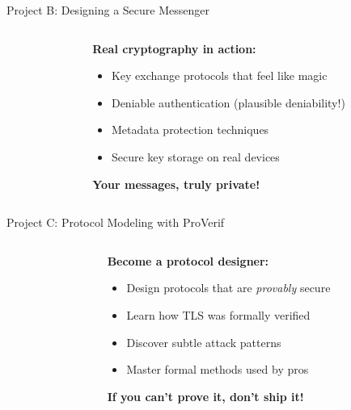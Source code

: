 \documentclass[aspectratio=169, lualatex, handout]{beamer}
\begin{document}
\begin{frame}{Project B: Designing a Secure Messenger}
	\begin{columns}[c]
		\begin{column}{0.5\textwidth}
		\end{column}
		\begin{column}{0.5\textwidth}
			\textbf{Real cryptography in action:}
			\begin{itemize}[<+->]
				\item Key exchange protocols that feel like magic
				\item Deniable authentication (plausible deniability!)
				\item Metadata protection techniques
				\item Secure key storage on real devices
			\end{itemize}
			\vspace{0.5cm}
			\textcolor{cipherprimary}{\textbf{Your messages, truly private!}}
		\end{column}
	\end{columns}
\end{frame}

\begin{frame}{Project C: Protocol Modeling with ProVerif}
	\begin{columns}[c]
		\begin{column}{0.5\textwidth}
		\end{column}
		\begin{column}{0.5\textwidth}
			\textbf{Become a protocol designer:}
			\begin{itemize}[<+->]
				\item Design protocols that are \textit{provably} secure
				\item Learn how TLS was formally verified
				\item Discover subtle attack patterns
				\item Master formal methods used by pros
			\end{itemize}
			\vspace{0.5cm}
			\textcolor{cipherprimary}{\textbf{If you can't prove it, don't ship it!}}
		\end{column}
	\end{columns}
\end{frame}
\end{document}

